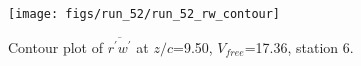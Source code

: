 \begin{figure}[H]
\centering
\texttt{[image: figs/run\_52/run\_52\_rw\_contour]}
\caption{Contour plot of $\overline{r^\prime w^\prime}$ at $z/c$=9.50, $V_{free}$=17.36, station 6.}
\end{figure}


